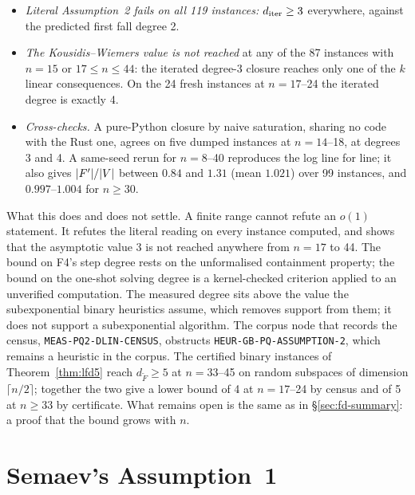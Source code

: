 \begin{itemize}
\item \emph{Literal Assumption~2 fails on all 119 instances:}
  $d_{\rm iter}\ge3$ everywhere, against the predicted first fall degree 2.
\item \emph{The Kousidis--Wiemers value is not reached} at any of the 87
  instances with $n=15$ or $17\le n\le44$: the iterated degree-3 closure
  reaches only one of the $k$ linear consequences. On the 24 fresh instances
  at $n=17$--24 the iterated degree is exactly 4.
\item \emph{Cross-checks.} A pure-Python closure by naive saturation, sharing
  no code with the Rust one, agrees on five dumped instances at $n=14$--18,
  at degrees 3 and 4. A same-seed rerun for $n=8$--40 reproduces the log
  line for line; it also gives $\lvert F' \rvert/\lvert V \rvert$ between $0.84$ and $1.31$
  (mean $1.021$) over 99 instances, and $0.997$--$1.004$ for $n\ge30$.
\end{itemize}

What this does and does not settle. A finite range cannot refute an $o(1)$
statement. It refutes the literal reading on every instance computed, and
shows that the asymptotic value 3 is not reached anywhere from $n=17$ to 44.
The bound on F4's step degree rests on the unformalised containment
property; the bound on the one-shot solving degree is a kernel-checked
criterion applied to an unverified computation. The measured degree sits
above the value the subexponential binary heuristics assume, which removes
support from them; it does not support a subexponential algorithm. The
corpus node that records the census, \texttt{MEAS-PQ2-DLIN-CENSUS},
obstructs \texttt{HEUR-GB-PQ-ASSUMPTION-2}, which remains a heuristic in the
corpus. The certified binary instances of Theorem~\ref{thm:lfd5} reach
$d_{\tilde F}\ge5$ at $n=33$--45 on random subspaces of dimension
$\lceil n/2\rceil$; together the two give a lower bound of 4 at $n=17$--24 by
census and of 5 at $n\ge33$ by certificate. What remains open is the same as
in \S\ref{sec:fd-summary}: a proof that the bound grows with $n$.

\section{Semaev's Assumption~1}\label{sec:hd-semaev}

